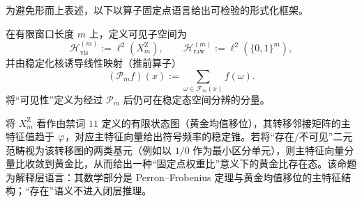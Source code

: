 为避免形而上表述，以下以算子固定点语言给出可检验的形式化框架。

\begin{definition}[可见性投影]\label{def:visibility-projection}
在有限窗口长度 $m$ 上，定义可见子空间为
\[
\mathcal{H}^{(m)}_{\mathrm{vis}}:=\ell^2(X_m^{\mathrm Z}),\qquad
\mathcal{H}^{(m)}_{\mathrm{raw}}:=\ell^2(\{0,1\}^m),
\]
并由稳定化核诱导线性映射（推前算子）
\[
(\mathcal{P}_m f)(x):=\sum_{\omega\in \mathcal{F}_m(x)} f(\omega).
\]
将“可见性”定义为经过 $\mathcal{P}_m$ 后仍可在稳定态空间分辨的分量。
\end{definition}

\begin{remark}
将 $X_m^{\mathrm Z}$ 看作由禁词 $11$ 定义的有限状态图（黄金均值移位），其转移邻接矩阵的主特征值趋于 $\varphi$，对应主特征向量给出符号频率的稳定锥。若将“存在/不可见”二元范畴视为该转移图的两类基元（例如以 $1/0$ 作为最小区分单元），则主特征向量分量比收敛到黄金比，从而给出一种“固定点权重比”意义下的黄金比存在态。该命题为解释层语言：其数学部分是 Perron--Frobenius 定理与黄金均值移位的主特征结构；“存在”语义不进入闭层推理。
\end{remark}

